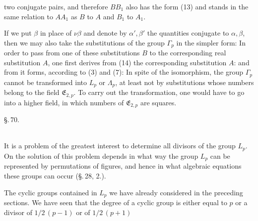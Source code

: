 two conjugate pairs, and therefore $BB_1$ also has the form (13) and stands in the same relation to $AA_1$ as $B$ to $A$ and $B_1$ to $A_1$.


If we put $\beta$ in place of $\nu\beta$ and denote by $\alpha', \beta'$ the quantities conjugate to $\alpha, \beta$, then we may also take the substitutions of the group $\Gamma_p$ in the simpler form:
In order to pass from one of these substitutions $B$ to the corresponding real substitution $A$, one first derives from (14) the corresponding substitution $A$:
and from it forms, according to (3) and (7):
In spite of the isomorphism, the group $\Gamma_p$ cannot be transformed into $L_p$ or $\Lambda_p$, at least not by substitutions whose numbers belong to the field $\mathfrak{E}_{2,p}$. To carry out the transformation, one would have to go into a higher field, in which  numbers of $\mathfrak{E}_{2,p}$ are squares.

\begin{center}
\S.\,70.\\
\\
\end{center}

It is a problem of the greatest interest to determine all divisors of the group $L_p$. On the solution of this problem depends in what way the group $L_p$ can be represented by permutations of figures, and hence in what algebraic equations these groups can occur (\S.\,28, 2.).

The cyclic groups contained in $L_p$ we have already considered in the preceding sections. We have seen that the degree of a cyclic group is either equal to $p$ or a divisor of $1/2\,(p-1)$ or of $1/2\,(p+1)$
